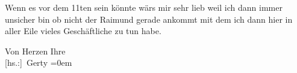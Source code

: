\pstart
           Wenn es vor dem 11ten{ }sein könnte wärs mir sehr lieb weil ich dann immer
               unsicher bin ob nicht der Raimund gerade
               ankommt mit dem ich dann hier in aller Eile vieles Geschäftliche zu tun habe.\pend
           
\pstart
           Von Herzen Ihre{\\[\baselineskip]}\spacefill\mbox{{[}hs.:{]} Gerty}\pend
           \leftskip=0em{}\endnumbering{}  \newcommand{\dateiname}{L02544}\newcommand{\titel}{Gerty Hofmannsthal an Arthur Schnitzler, [5. 3. 1931]}\newcommand{\editorInnen}{Martin Anton Müller und Gerd-Hermann Susen}
